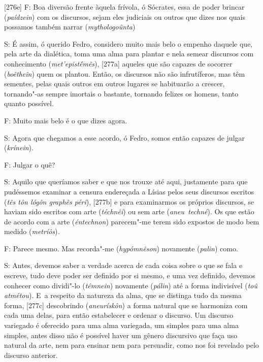  

[276e] F: Boa diversão frente àquela frívola, ó Sócrates, essa de
poder brincar (\emph{paídzein}) com os discursos, sejam eles judiciais
ou outros que dizes nos quais possamos também narrar
(\emph{mythologoûnta})

 

S: É assim, ó querido Fedro, considero muito mais belo o empenho daquele
que, pela arte da dialética, toma uma alma para plantar e nela semear
discursos com conhecimento (\emph{met'epistḗmês}), [277a] aqueles
que são capazes de socorrer (\emph{boêtheîn}) quem os plantou. Então, os
discursos não são infrutíferos, mas têm sementes, pelas quais outros em
outros lugares se habituarão a crescer, tornando"-as sempre imortais o
bastante, tornando felizes os homens, tanto quanto possível.

 

F: Muito mais belo é o que dizes agora.

 

S: Agora que chegamos a esse acordo, ó Fedro, somos então capazes de
julgar (\emph{krínein}).

 

F: Julgar o quê?

 

S: Aquilo que queríamos saber e que nos trouxe até aqui, justamente para
que pudéssemos examinar a censura endereçada a Lísias pelos seus
discursos escritos (\emph{tês tôn lógôn graphês péri}), [277b] e
para examinarmos os próprios discursos, se haviam sido escritos com arte
(\emph{téchnêi}) ou sem arte (\emph{aneu~techné}). Os que estão de
acordo com a arte (\emph{éntechnon}) parecem"-me terem sido expostos de
modo bem medido (\emph{metríôs})\emph{.}

 

F: Parece mesmo. Mas recorda"-me (\emph{hypómnêson}) novamente
(\emph{palin}) como.

 

S: Antes, devemos saber a verdade acerca de cada coisa sobre o que se
fala e escreve, tudo deve poder ser definido por si mesmo, e uma vez
definido, devemos conhecer como dividi"-lo (\emph{témnein}) novamente
(\emph{pálin}) até a forma indivisível (\emph{toû atmétou}). E~a
respeito da natureza da alma, que se distinga tudo da mesma forma,
[277c] descobrindo (\emph{aneurískôn}) a forma natural que se
harmoniza com cada uma delas, para então estabelecer e ordenar o
discurso. Um discurso variegado é oferecido para uma alma variegada, um
simples para uma alma simples, antes disso não é possível haver um
gênero discursivo que faça uso natural da arte, nem para ensinar nem
para persuadir, como nos foi revelado pelo discurso anterior.

